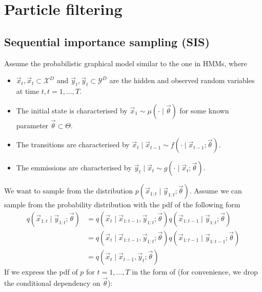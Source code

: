 \section{Particle filtering}
\subsection{Sequential importance sampling (SIS)}
    Assume the probabilistic graphical model similar to the one in HMMs, where
    \begin{itemize}
        \item $\vec x_t, \vec x_t \subset \mathcal X^D$ and $\vec y_t, \vec y_t \subset \mathcal Y^D$ are the hidden and observed random variables at time $t, t = 1, \dotsc, T$.
        \item The initial state is characterised by $\vec x_1 \sim \mu(\cdot \mid \vec \theta)$ for some known parameter $\vec \theta \subset \Theta$.
        \item The transitions are characterised by $\vec x_t \mid \vec x_{t - 1} \sim f(\cdot \mid \vec x_{t - 1}; \vec \theta )$.
        \item The emmissions are characterised by $\vec y_t \mid \vec x_t \sim g(\cdot \mid \vec x_t; \vec \theta )$.
    \end{itemize}
    We want to sample from the distribution $p(\vec x_{1:t} \mid \vec y_{1:t}; \vec \theta)$. Assume we can sample from the probability distribution with the pdf of the following form
    \begin{align}
        q(\vec x_{1:t} \mid \vec y_{1:t}; \vec \theta)  &= q(\vec x_t \mid \vec x_{1:t - 1}, \vec y_{1:t}; \vec \theta) q(\vec x_{1:t-1} \mid \vec y_{1:t}; \vec \theta) \\
                                                        &= q(\vec x_t \mid \vec x_{1:t - 1}, \vec y_{1:t}; \vec \theta) q(\vec x_{1:t-1} \mid \vec y_{1:t - 1}; \vec \theta) \\
                                                        &= q(\vec x_t \mid \vec x_{t - 1}, \vec y_t; \vec \theta)
    \end{align}
    If we express the pdf of $p$ for $t = 1, \dotsc, T$ in the form of (for convenience, we drop the conditional dependency on $\vec \theta$):
